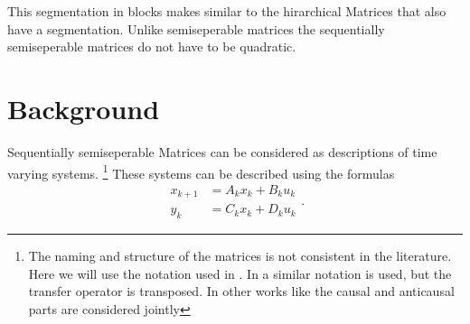 \documentclass[doctype=mastersthesis,BCOR=15mm,biblatex]{ldvbook}%
\begin{document}
This segmentation in blocks makes similar to the hirarchical Matrices that also have a segmentation.
Unlike semiseperable matrices the sequentially semiseperable matrices do not have to be quadratic. 

\chapter{Background}\label{chap:background}


Sequentially semiseperable Matrices can be considered as descriptions of time varying systems.
\footnote{
The naming and structure of the matrices is not consistent in the literature.
Here we will use the notation used in \cite{tong_blind_2003}. 
In \cite{dewilde_time-varying_1998} a similar notation is used, but the transfer operator is transposed.
In other works like \cite{rice_efficient_2010,chandrasekaran_fast_2002} the causal and anticausal parts are considered jointly
}
These systems can be described using the formulas
\begin{subequations}
	\begin{align}
	x_{k+1} &= A_k x_k + B_k u_k \\
	y_k &= C_k x_k + D_k u_k 
	\end{align}.
	\label{eq:def_causal}
\end{subequations}
\end{document}

